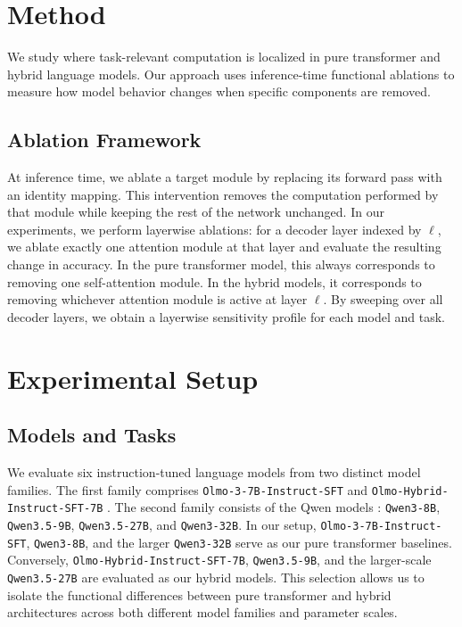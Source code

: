 \documentclass{article}
\begin{document}
\section{Method}
\label{sec:method}

We study where task-relevant computation is localized in pure transformer and hybrid language models. Our approach uses inference-time functional ablations to measure how model behavior changes when specific components are removed.

\subsection{Ablation Framework}
At inference time, we ablate a target module by replacing its forward pass with an identity mapping. 
This intervention removes the computation performed by that module while keeping the rest of the network unchanged. 
In our experiments, we perform layerwise ablations: for a decoder layer indexed by $\ell$, we ablate exactly one attention module at that layer and evaluate the resulting change in accuracy. 
In the pure transformer model, this always corresponds to removing one self-attention module. 
In the hybrid models, it corresponds to removing whichever attention module is active at layer $\ell$. 
By sweeping over all decoder layers, we obtain a layerwise sensitivity profile for each model and task.

\section{Experimental Setup}
\label{sec:exp}

\subsection{Models and Tasks}
\label{sec:models_and_tasks}
We evaluate six instruction-tuned language models from two distinct model families. The first family comprises \texttt{Olmo-3-7B-Instruct-SFT} \cite{olmo2025olmo3} and \texttt{Olmo-Hybrid-Instruct-SFT-7B} \cite{merrill2026olmohybridtheorypractice}. The second family consists of the Qwen models \cite{yang2025qwen3technicalreport}: \texttt{Qwen3-8B}, \texttt{Qwen3.5-9B}, \texttt{Qwen3.5-27B}, and \texttt{Qwen3-32B}. In our setup, \texttt{Olmo-3-7B-Instruct-SFT}, \texttt{Qwen3-8B}, and the larger \texttt{Qwen3-32B} serve as our pure transformer baselines. Conversely, \texttt{Olmo-Hybrid-Instruct-SFT-7B}, \texttt{Qwen3.5-9B}, and the larger-scale \texttt{Qwen3.5-27B} are evaluated as our hybrid models. This selection allows us to isolate the functional differences between pure transformer and hybrid architectures across both different model families and parameter scales.
\end{document}
